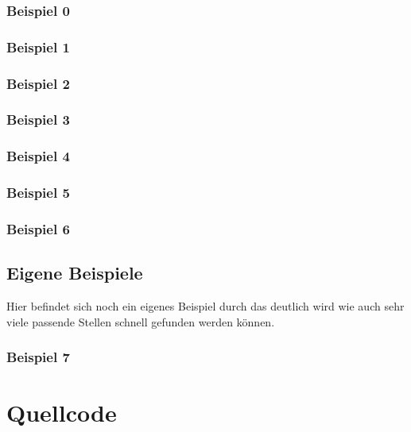 \documentclass[a4paper,10pt,ngerman]{scrartcl}
\begin{document}
      \subsubsection{Beispiel 0}
        
      \subsubsection{Beispiel 1}
        
      \subsubsection{Beispiel 2}
        
      \subsubsection{Beispiel 3}
        
      \subsubsection{Beispiel 4}
        
      \subsubsection{Beispiel 5}
        
      \subsubsection{Beispiel 6}
        
    \subsection{Eigene Beispiele} 
      Hier befindet sich noch ein eigenes Beispiel durch das deutlich wird wie auch sehr viele passende Stellen schnell gefunden werden können.
      \subsubsection{Beispiel 7}
        
  \section{Quellcode}
    
\end{document}
